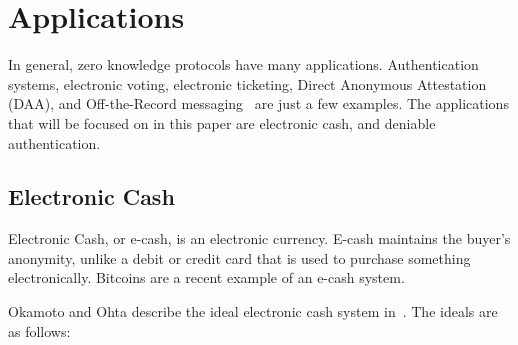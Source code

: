 \documentclass{sig-alternate}
\begin{document}
	    
	    \begin{comment}
		\begin{verbatim}
		computation: // compute values required for proof
		  given: // declarations
		    group: G = <g. h>
		    exponents in G: x[2:3]
		  compute: // declarations and assignments
		    random exponents in G: r[1:3]
		    x_1 := x_2 * x_3
		    for(i, 1:3, c_i := g^x_i * h^r_i)
		    
		proof:
		  given: // declarations of public values
		    group: G = <g, h>
		    elements in G: c[1:3]
		    for(i, 1:3, commitment to x_i: c_i = g^x_i * h^r_i)
		  prove knowledge of: // declarations of private values
		    exponents in G: x[1:3], r[1:3]
		  such that: // protocol specification; i.e. relations
		    x_1 = x_2 * x_3
		\end{verbatim}
		
		In this example, the authors are proving that the value $x_{1}$ contained within
		the commitment $c_{1}$ is the product of $x_{2}$ and $x_{3}$ which are contained
		in $c_{2}$ and $c_{3}$ respectively. Because both blocks are optional, they are
		considered independent from each other, so a lines are repeated between the two.
		\end{comment}


\section{Applications}
	In general, zero knowledge protocols have many applications. Authentication systems,
	electronic voting, electronic ticketing, Direct Anonymous Attestation (DAA), and
	Off-the-Record messaging~\cite{ZKCrypt:2012, ZKPDL:2010} are just a few examples.
	The applications that will be focused on in this paper are electronic cash, and
	deniable authentication.
	
	\subsection{Electronic Cash}
	Electronic Cash, or e-cash, is an electronic currency. E-cash maintains the buyer's
	anonymity, unlike a debit or credit card that is used to purchase something 
	electronically. Bitcoins are a recent example of an e-cash system.
	
	Okamoto and Ohta describe the ideal electronic cash system in~\cite{Ecash:1991}.
	The ideals are as follows:
	
\end{document}
